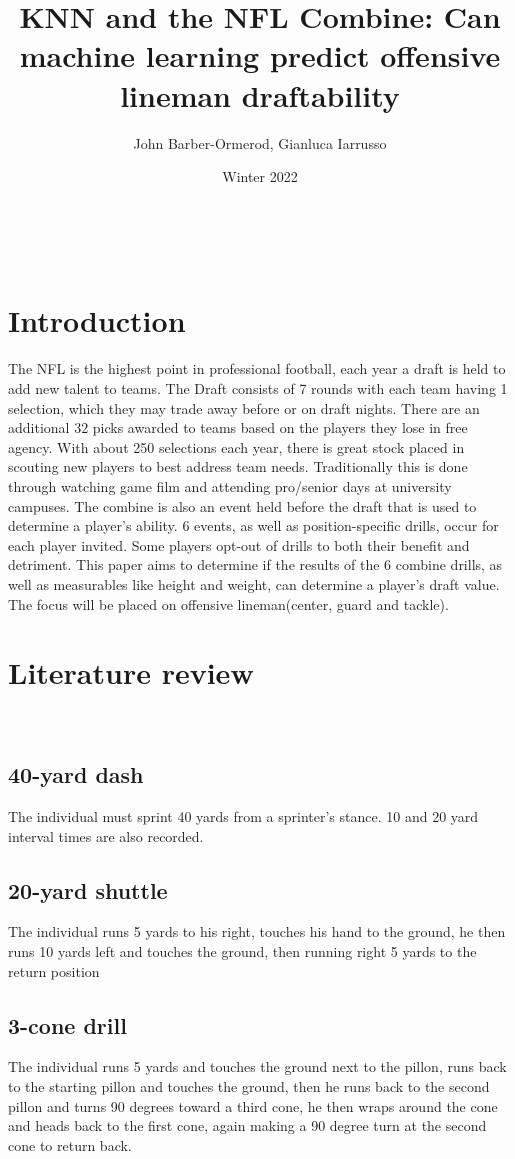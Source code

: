 \documentclass[confrence]{IEEEtran}
\title{KNN and the NFL Combine\texttrademark: Can machine learning predict offensive lineman draftability}
\author{John Barber-Ormerod, Gianluca Iarrusso}
\date{Winter 2022}
\begin{document}
\maketitle
\\
\section*{Introduction}
The NFL is the highest point in professional football, each year a draft is held to add new talent to teams. 
The Draft consists of 7 rounds with each team having 1 selection, 
which they may trade away before or on draft nights. 
There are an additional 32 picks awarded to teams based on the players they lose in free agency. 
With about 250 selections each year, there is great stock placed in scouting new players to best address team needs. 
Traditionally this is done through watching game film and attending pro/senior days at university campuses. 
The combine is also an event held before the draft that is used to determine a player's ability. 
6 events, as well as position-specific drills, occur for each player invited. 
Some players opt-out of drills to both their benefit and detriment. 
This paper aims to determine if the results of the 6 combine drills, as well as measurables like height and weight, can determine a player's draft value. 
The focus will be placed on offensive lineman(center, guard and tackle).
\\
\section*{Literature review}
\\
\subsection*{40-yard dash}
The individual must sprint 40 yards from a sprinter's stance. 10 and 20 yard interval times are also recorded.
\\
\subsection*{20-yard shuttle}
The individual runs 5 yards to his right, touches his hand to the ground, he then runs 10 yards left and touches the ground, then running right 5 yards to the return position
\\
\subsection*{3-cone drill}
The individual runs 5 yards and touches the ground next to the pillon, runs back to the starting pillon and touches the ground, then he runs back to the second pillon and turns 90 degrees toward a third cone, he then wraps around the cone and heads back to the first cone, again making a 90 degree turn at the second cone to return back. 
\\
\end{document}
